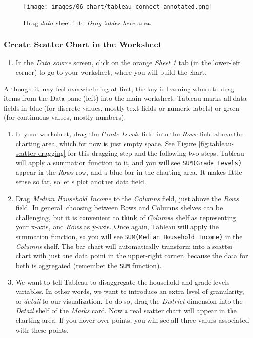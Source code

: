 \documentclass[
  english,
]{book}
\providecommand{\tightlist}{%
  \setlength{\itemsep}{0pt}\setlength{\parskip}{0pt}}
\begin{document}
\begin{figure}
\centering
\texttt{[image: images/06-chart/tableau-connect-annotated.png]}
\caption{\label{fig:tableau-connect}Drag \emph{data} sheet into \emph{Drag tables here} area.}
\end{figure}

\hypertarget{create-scatter-chart-in-the-worksheet}{%
\subsubsection*{Create Scatter Chart in the Worksheet}\label{create-scatter-chart-in-the-worksheet}}

\begin{enumerate}
\def\labelenumi{\arabic{enumi}.}
\tightlist
\item
  In the \emph{Data source} screen, click on the orange \emph{Sheet 1} tab (in the lower-left corner) to go to your worksheet, where you will build the chart.
\end{enumerate}

Although it may feel overwhelming at first, the key is learning where to drag items from the Data pane (left) into the main worksheet. Tableau marks all data fields in blue (for discrete values, mostly text fields or numeric labels) or green (for continuous values, mostly numbers).

\begin{enumerate}
\def\labelenumi{\arabic{enumi}.}
\setcounter{enumi}{1}
\item
  In your worksheet, drag the \emph{Grade Levels} field into the \emph{Rows} field above the charting area, which
  for now is just empty space. See Figure \ref{fig:tableau-scatter-dragging} for this dragging step and the following two steps. Tableau will apply a summation function to it, and you will see \texttt{SUM(Grade\ Levels)} appear
  in the \emph{Rows} row, and a blue bar in the charting area. It makes little sense so far, so let's plot another data field.
\item
  Drag \emph{Median Household Income} to the \emph{Columns} field, just above the \emph{Rows} field. In general, choosing between Rows and Columns shelves can be challenging, but it is convenient to think of \emph{Columns} shelf as representing your x-axis, and \emph{Rows} as y-axis. Once again, Tableau will apply the summation function, so you will see \texttt{SUM(Median\ Household\ Income)} in the \emph{Columns} shelf. The bar chart will automatically transform into a scatter chart with just one data point in the upper-right corner, because the data for both is aggregated (remember the \texttt{SUM} function).
\item
  We want to tell Tableau to disaggregate the household and grade levels variables. In other words, we want to introduce an extra level of granularity, or \emph{detail} to our visualization. To do so, drag the \emph{District} dimension into the \emph{Detail} shelf of the \emph{Marks} card. Now a real scatter chart will appear in the charting area. If you hover over points, you will see all three values associated with these points.
\end{enumerate}
\end{document}
